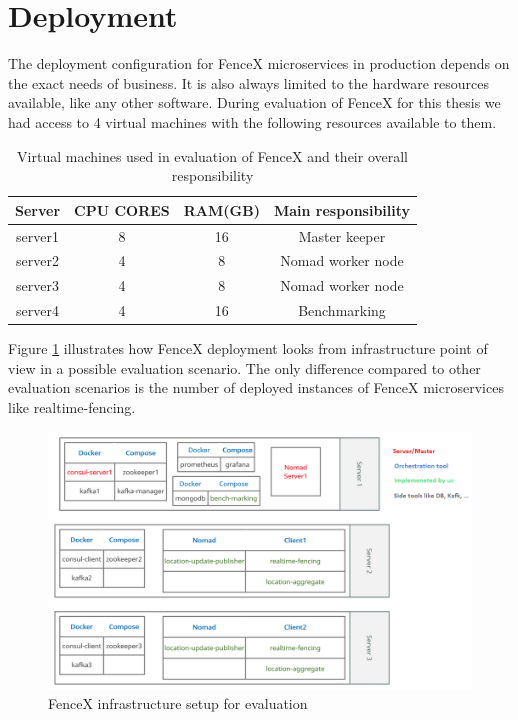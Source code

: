 \documentclass[a4]{report}
\begin{document}
    \section{Deployment}
    The deployment configuration for FenceX microservices in production depends on the exact needs of business.
    It is also always limited to the hardware resources available, like any other software.
    During evaluation of FenceX for this thesis we had access to 4 virtual machines with the following resources
    available to them.

    \begin{table}[h!]
        \centering
        \begin{tabular}{|c|c|c|c|}
            \hline
            Server  & CPU CORES & RAM(GB) & Main responsibility \\
            \hline
            server1 & 8         & 16      & Master keeper       \\
            server2 & 4         & 8       & Nomad worker node   \\
            server3 & 4         & 8       & Nomad worker node   \\
            server4 & 4         & 16      & Benchmarking        \\
            \hline
        \end{tabular}
        \caption{Virtual machines used in evaluation of FenceX and their overall responsibility}
        \label{table:vms}
    \end{table}

    Figure \ref{fig:infrastructure} illustrates how FenceX deployment looks from infrastructure point of view in a
    possible evaluation scenario.
    The only difference compared to other evaluation scenarios is the number of deployed instances of FenceX
    microservices like realtime-fencing.

    \begin{figure}[ht]
        \caption{FenceX infrastructure setup for evaluation}
        \label{fig:infrastructure}
        \includegraphics[scale=0.6]{images/Infrsutracture.png}
    \end{figure}
\end{document}
